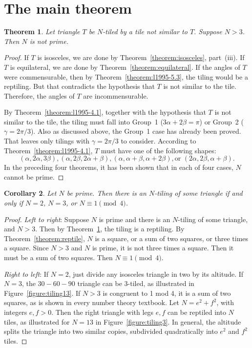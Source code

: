 \documentclass{amsart}
\theoremstyle{plain}
\newtheorem{theorem}{Theorem}
\newtheorem{corollary}[theorem]{Corollary}
\theoremstyle{definition}
\theoremstyle{remark}
\begin{document}
\section{The main theorem}


\begin{theorem} \label{theorem:main}
Let triangle $T$  be $N$-tiled by a tile not similar to $T$.  Suppose $N > 3$.
 Then $N$ is not prime.
\end{theorem}

\begin{proof}  If $T$ is isosceles, we are done by Theorem~\ref{theorem:isosceles}, part~(iii).
If $T$ is equilateral, we are done by Theorem~\ref{theorem:equilateral}.   If 
the angles of $T$ were commensurable, then by Theorem~\ref{theorem:l1995-5.3},
the tiling would be a reptiling.  But that contradicts the hypothesis that $T$ is 
not similar to the tile.   Therefore, the angles of $T$ are incommensurable.



By Theorem~\ref{theorem:l1995-4.1}, together with the hypothesis that $T$ is not similar to the tile, 
 the tiling must fall into Group~1 ($3\alpha + 2\beta =\pi$) or Group~2 ($\gamma = 2\pi/3$).
Also as discussed above, the Group~1 case has already been proved.  That leaves only tilings with 
$\gamma = 2\pi/3$ to consider.  According to Theorem~\ref{theorem:l1995-4.1}, $T$ must have
one of the following shapes:
$$(\alpha, 2\alpha, 3\beta), (\alpha, 2\beta, 2\alpha + \beta), (\alpha, \alpha+\beta, \alpha+2\beta), \text{or }  (2\alpha, 2\beta, \alpha+\beta).$$
In the preceding four theorems, it has been shown that in each of four cases, $N$ cannot be prime.
\end{proof}

\begin{corollary} \label{corollary:634}
Let $N$ be prime.  Then there is an $N$-tiling of some triangle if and only if $N = 2$, $N =3$, or 
$N \equiv 1 \pmod 4$.
\end{corollary}

\begin{proof} {\em Left to right}: Suppose $N$ is prime and there is an $N$-tiling of some triangle, and $N > 3$.
Then by Theorem~\ref{theorem:main},  the tiling is a reptiling. By Theorem~\ref{theorem:reptile},
$N$ is a square, or a sum of two squares, or three times a  square.  Since $N > 3$ and $N$ is prime,
it is not three times a square.  Then 
it must be a sum of two squares.  Then $N \equiv 1 \pmod 4$.
\smallskip

{\em Right to left}:  If $N = 2$, just divide any isosceles triangle in two by its altitude.  If $N=3$,
the $30-60-90$ triangle can be 3-tiled, as illustrated in Figure~\ref{figure:tiling13}.  If $N > 3$ is congruent to 1 mod 4,  it is a sum of two squares,
as is shown in every number theory textbook.  Let $N = e^2 + f^2$, with integers $e,f > 0$. 
Then the right triangle with legs $e,f$ can be reptiled into $N$ tiles, as illustrated for $N=13$ 
in Figure~\ref{figure:tiling3}.  In general, the altitude splits the triangle into two similar copies, subdivided quadratically into 
$e^2$ and $f^2$ tiles.
\end{proof}
\end{document}
